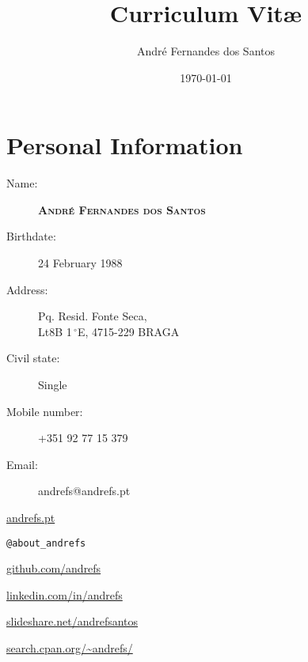 \documentclass{article}
\author{André Fernandes dos Santos}
\title{Curriculum Vit\ae}
\date{\today}
\begin{document}
\maketitle

\section{Personal Information}
	\begin{description}
	\item [Name:] \large\textbf{\textsc{André Fernandes dos Santos}}
	\end{description}
\begin{multicols}{2}
	\begin{description}
	\item [Birthdate:] 24 February 1988
	\item [Address:] Pq. Resid. Fonte Seca,\\Lt8B 1$\,^{\circ}$E, 4715-229 BRAGA
	\item [Civil state:] Single
	\item [Mobile number:] +351 92 77 15 379
	\item [Email:] andrefs@andrefs.pt
	\end{description}
	\vfill

	\columnbreak

	\begin{description}
		\small
		\item [Homepage:] \url{andrefs.pt}
		\item [Twitter:] \texttt{@about\_andrefs} 
		\item [GitHub:] \url{github.com/andrefs} 
		\item [LinkedIn:] \url{linkedin.com/in/andrefs}
		\item [SlideShare:] \url{slideshare.net/andrefsantos}
		\item [CPAN:] \url{search.cpan.org/~andrefs/}
	\end{description}
	\vspace*{\fill}
\end{multicols}
\end{document}
